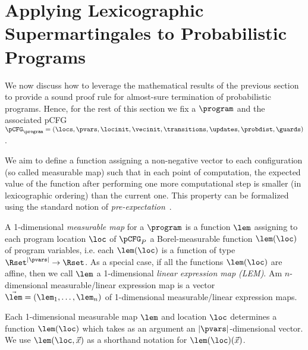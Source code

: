 \section{Applying Lexicographic Supermartingales to Probabilistic Programs}

We now discuss how to leverage the mathematical results of the previous section to provide a sound proof rule for almost-sure termination of probabilistic programs. Hence, for the rest of this section we fix a \PP{} $\program$ and the associated pCFG $\pCFG_\program=(\locs,\pvars,\locinit,\vecinit,\transitions,\updates,\probdist,\guards)$.

We aim to define a function assigning a non-negative vector to each configuration (so called measurable map) such that in each point of computation, the expected value of the function after performing one more computational step is smaller (in lexicographic ordering) than the current one. This property can be formalized using the standard  notion of \emph{pre-expectation}~\cite{xxx}.

\begin{definition}
A 1-dimensional \emph{measurable map} for a \PP{} $\program$ is a function $\lem$ 
assigning to each program location $\loc$ of $\pCFG_P$ a Borel-measurable function $\lem(\loc)$  of program variables, i.e. each $\lem(\loc)$  is a function of type $\Rset^{|\pvars|}\rightarrow \Rset$. As a special case, if all the functions $\lem(\loc)$ are affine, then we call $\lem$ a 1-dimensional \emph{linear expression map (LEM)}. 
Am $n$-dimensional measurable/linear expression map is a vector $\vec{\lem}=(\lem_1,\dots,\lem_n)$ of 1-dimensional measurable/linear expression maps. 
\end{definition}

Each 1-dimensional measurable map $\lem$ and location $\loc$ determines a function $\lem(\loc)$ 
which takes as an argument an $|\pvars|$-dimensional vector. We use $\lem(\loc,\vec{x})$ as a shorthand 
notation for $\lem(\loc)(\vec{x})$.

